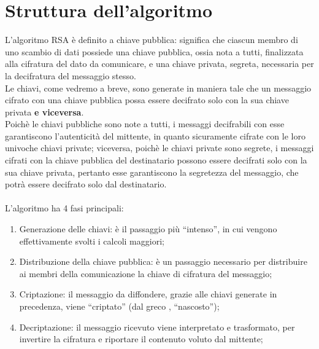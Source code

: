 \section{Struttura dell'algoritmo}
L'algoritmo RSA è definito a chiave pubblica: significa che ciascun membro di uno scambio di dati possiede una chiave pubblica, ossia nota a tutti, finalizzata alla cifratura del dato da comunicare, e una chiave privata, segreta, necessaria per la decifratura del messaggio stesso.\\
Le chiavi, come vedremo a breve, sono generate in maniera tale che un messaggio cifrato con una chiave pubblica possa essere decifrato solo con la sua chiave privata \textbf{e viceversa}.\\
Poichè le chiavi pubbliche sono note a tutti, i messaggi decifrabili con esse garantiscono l'autenticità del mittente, in quanto sicuramente cifrate con le loro univoche chiavi private; viceversa, poichè le chiavi private sono segrete, i messaggi cifrati con la chiave pubblica del destinatario possono essere decifrati solo con la sua chiave privata, pertanto esse garantiscono la segretezza del messaggio, che potrà essere decifrato solo dal destinatario.\\\\
L'algoritmo ha 4 fasi principali:
\begin{enumerate}
    \item Generazione delle chiavi: è il passaggio più ``intenso'', in cui vengono effettivamente svolti i calcoli maggiori;
    \item Distribuzione della chiave pubblica: è un passaggio necessario per distribuire ai membri della comunicazione la chiave di cifratura del messaggio;
    \item Criptazione: il messaggio da diffondere, grazie alle chiavi generate in precedenza, viene ``criptato'' (dal greco \textkappa \textrho \textupsilon \textpi \texttau \textomikron \textvarsigma, ``nascosto'');
    \item Decriptazione: il messaggio ricevuto viene interpretato e trasformato, per invertire la cifratura e riportare il contenuto voluto dal mittente;
\end{enumerate}



